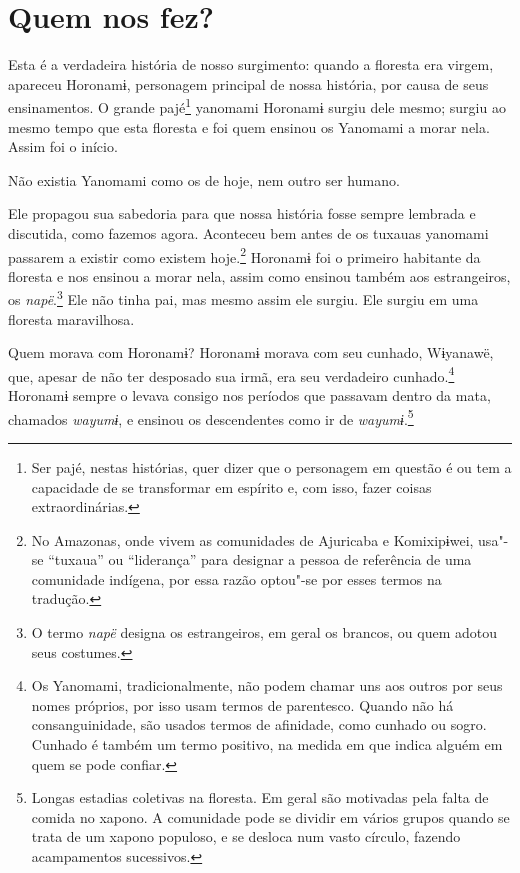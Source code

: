 

\section*{Quem nos fez?}

Esta é a verdadeira história de nosso surgimento: quando a floresta era
virgem, apareceu Horonamɨ, personagem principal de nossa história, por
causa de seus ensinamentos. O grande pajé\footnote{  Ser pajé, nestas histórias, quer dizer que o personagem em questão é ou
tem a capacidade de se transformar em espírito e, com isso, fazer coisas
extraordinárias.}  yanomami
Horonamɨ surgiu dele mesmo; surgiu ao mesmo tempo que esta floresta e
foi quem ensinou os Yanomami a morar nela. Assim foi o início. 

Não existia Yanomami como os de hoje, nem outro ser humano. 

Ele propagou sua sabedoria para que nossa história fosse sempre lembrada
e discutida, como fazemos agora. Aconteceu bem antes de os tuxauas
yanomami passarem a existir como existem
hoje.\footnote{  No Amazonas, onde vivem as comunidades de Ajuricaba e Komixipɨwei,
usa"-se ``tuxaua'' ou ``liderança'' para designar a pessoa de referência
de uma comunidade indígena, por essa razão optou"-se por esses termos na
tradução.}  Horonamɨ foi o primeiro habitante da floresta e
nos ensinou a morar nela, assim como ensinou também aos estrangeiros,
os \emph{napë}.\footnote{   O termo \emph{napë} designa os estrangeiros, em geral os brancos, ou quem adotou seus costumes.}  Ele não tinha pai, mas mesmo assim
ele surgiu. Ele surgiu em uma floresta maravilhosa. 

Quem morava com Horonamɨ? Horonamɨ morava com seu cunhado, Wɨyanawë,
que, apesar de não ter desposado sua irmã, era seu verdadeiro
cunhado.\footnote{  Os Yanomami, tradicionalmente, não podem chamar uns aos outros por seus nomes próprios, por isso usam termos de parentesco. Quando não há
consanguinidade, são usados termos de afinidade, como cunhado ou sogro.
Cunhado é também um termo positivo, na medida em que indica alguém em
quem se pode confiar.} Horonamɨ sempre o levava consigo nos
períodos que passavam dentro da mata, chamados \emph{wayumɨ}, e ensinou
os descendentes como ir de \emph{wayumɨ}.\footnote{   Longas estadias coletivas na floresta. Em geral são motivadas pela falta de comida no xapono. A comunidade pode se dividir em vários grupos quando se trata de um xapono populoso, e se desloca num vasto círculo, fazendo acampamentos sucessivos.}

